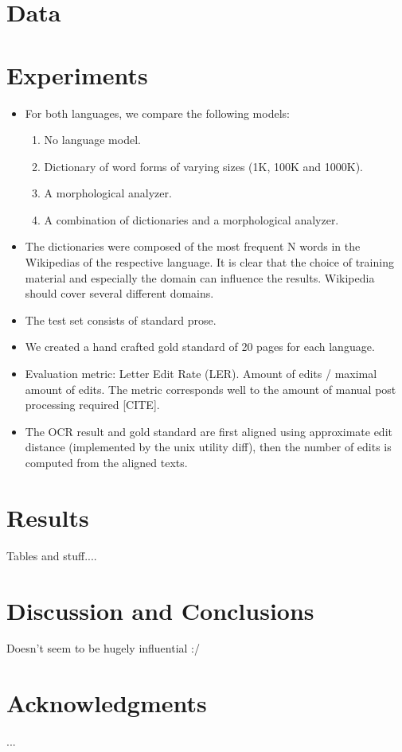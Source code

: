 \documentclass[b5paper]{article}
\begin{document}
\section{Data}

\section{Experiments}

\begin{itemize}
\item For both languages, we compare the following models:
\begin{enumerate}
\item No language model.
\item Dictionary of word forms of varying sizes (1K, 100K and 1000K).
\item A morphological analyzer.
\item A combination of dictionaries and a morphological analyzer.
\end{enumerate} 

\item The dictionaries were composed of the most frequent N words in
  the Wikipedias of the respective language. It is clear that the
  choice of training material and especially the domain can influence
  the results. Wikipedia should cover several different domains.

\item The test set consists of standard prose.

\item We created a hand crafted gold standard of 20 pages for each
  language.

\item Evaluation metric: Letter Edit Rate (LER). Amount of edits / maximal
  amount of edits. The metric corresponds well to the amount of manual
  post processing required [CITE].

\item The OCR result and gold standard are first aligned using
  approximate edit distance (implemented by the unix utility diff),
  then the number of edits is computed from the aligned texts.
\end{itemize}

\section{Results}

Tables and stuff....

\section{Discussion and Conclusions}

Doesn't seem to be hugely influential :/
\section*{Acknowledgments}

...



\end{document}
